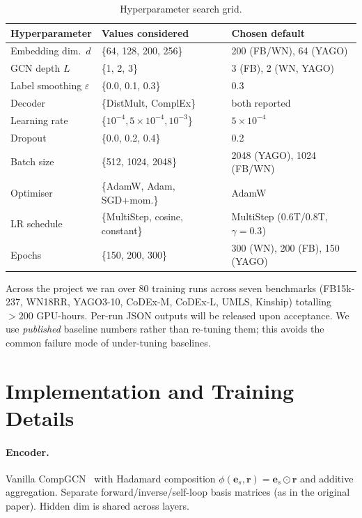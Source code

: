 \begin{table}[!htbp]
\centering
\caption{Hyperparameter search grid.}
\label{tab:hp-grid}
\small
\begin{tabular}{lll}
\toprule
Hyperparameter & Values considered & Chosen default \\
\midrule
Embedding dim.\ $d$      & \{64, 128, 200, 256\}                & 200 (FB/WN), 64 (YAGO) \\
GCN depth $L$            & \{1, 2, 3\}                          & 3 (FB), 2 (WN, YAGO) \\
Label smoothing $\varepsilon$ & \{0.0, 0.1, 0.3\}               & 0.3 \\
Decoder                  & \{DistMult, ComplEx\}                & both reported \\
Learning rate            & \{$10^{-4}, 5\!\times\!10^{-4}, 10^{-3}$\} & $5\!\times\!10^{-4}$ \\
Dropout                  & \{0.0, 0.2, 0.4\}                    & 0.2 \\
Batch size               & \{512, 1024, 2048\}                  & 2048 (YAGO), 1024 (FB/WN) \\
Optimiser                & \{AdamW, Adam, SGD+mom.\}            & AdamW \\
LR schedule              & \{MultiStep, cosine, constant\}      & MultiStep (0.6T/0.8T, $\gamma{=}0.3$) \\
Epochs                   & \{150, 200, 300\}                    & 300 (WN), 200 (FB), 150 (YAGO) \\
\bottomrule
\end{tabular}
\end{table}

Across the project we ran over 80 training runs across seven benchmarks (FB15k-237, WN18RR, YAGO3-10, CoDEx-M, CoDEx-L, UMLS, Kinship) totalling $>200$ GPU-hours. Per-run JSON outputs will be released upon acceptance.
We use \emph{published} baseline numbers rather than re-tuning them; this avoids the common failure mode of under-tuning baselines.

\section{Implementation and Training Details}
\label{app:impl}

\paragraph{Encoder.} Vanilla CompGCN~\citep{compgcn} with Hadamard composition $\phi(\mathbf{e}_s, \mathbf{r}) = \mathbf{e}_s \odot \mathbf{r}$ and additive aggregation. Separate forward/inverse/self-loop basis matrices (as in the original paper). Hidden dim is shared across layers.

